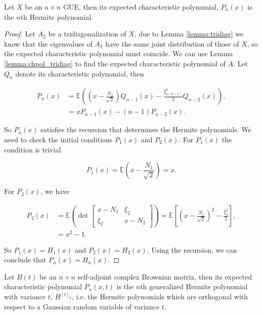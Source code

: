 \begin{theorem}
    Let $X$ be an $n\times n$ GUE, then its expected characteristic polynomial, $P_n(x)$ is the $n$th Hermite polynomial.
\end{theorem}

\begin{proof}
    Let $A_2$ be a tridiagonalization of $X$, due to Lemma \ref{lemma:tridiag} we know that the eigenvalues of $A_2$ have the same joint distribution of those of $X$, so the expected characteristic polynomial must coincide. We can use Lemma \ref{lemma:chpol_tridiag} to find the expected characteristic polynomial of $A$. Let $Q_n$ denote its characteristic polynomial, then

    \begin{align*}
        P_n(x) &= \mathbb E\left( \left(x - \frac{N_1}{\sqrt2}\right)Q_{n-1}(x) - \frac{\xi_{2(n-1)}^2}{2}Q_{n-2}(x) \right),\\ 
               &= xP_{n-1}(x) - (n-1)P_{n-2}(x).
    \end{align*}

    So $P_n(x)$ satisfies the recursion that determines the Hermite polynomials. We need to check the initial conditions $P_1(x)$ and $P_2(x)$. For $P_1(x)$ the condition is trivial

    \begin{equation*}
        P_1(x) = \mathbb E \left( x - \frac{N_1}{\sqrt{2}} \right) = x.
    \end{equation*}

    For $P_2(x)$, we have

    \begin{align*}
        P_2(x) &= \mathbb E \left( \det \begin{bmatrix}
        x - N_1 & \xi_{2} \\ 
        \xi_2 & x - N_2
        \end{bmatrix} \right) = \mathbb E \left[ \left(x - \frac{N_1}{\sqrt{2}}\right)^2 - \frac{\xi_2^2}2 \right],\\ 
        &= x^2 - 1.
    \end{align*}

    So $P_1(x) = H_1(x)$ and $P_2(x) = H_2(x)$. Using the recursion, we can conclude that $P_n(x) = H_n(x)$.
\end{proof}

\begin{corollary} \label{corollary:brownian_expected}
    Let $B(t)$ be an $n\times n$ self-adjoint complex Brownian matrix, then its expected characteristic polynomial $P_n(x,t)$ is the $n$th generalized Hermite polynomial with variance $t$, $H^{[t]_n}$, i.e. the Hermite polynomials which are orthogonal with respect to a Gaussian random variable of variance $t$.

\end{corollary}

